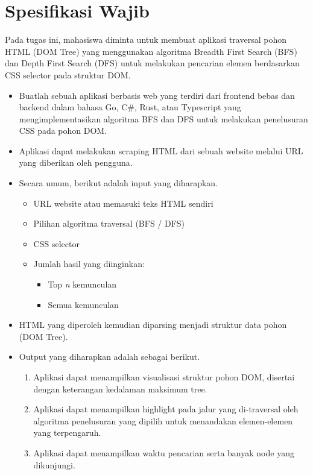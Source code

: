 \section{Spesifikasi Wajib}
Pada tugas ini, mahasiswa diminta untuk membuat aplikasi traversal pohon HTML (DOM Tree) yang menggunakan algoritma Breadth First Search (BFS) dan Depth First Search (DFS) untuk melakukan pencarian elemen berdasarkan CSS selector pada struktur DOM.
\begin{itemize}
    \item Buatlah sebuah aplikasi berbasis web yang terdiri dari frontend bebas dan backend dalam bahasa Go, C\#, Rust, atau Typescript yang mengimplementasikan algoritma BFS dan DFS untuk melakukan penelusuran CSS pada pohon DOM.
    \item Aplikasi dapat melakukan scraping HTML dari sebuah website melalui URL yang diberikan oleh pengguna.
    \item Secara umum, berikut adalah input yang diharapkan.
          \begin{itemize}
              \item URL website atau memasuki teks HTML sendiri
              \item Pilihan algoritma traversal (BFS / DFS)
              \item CSS selector
              \item Jumlah hasil yang diinginkan:
                    \begin{itemize}
                        \item Top \textit{n} kemunculan
                        \item Semua kemunculan
                    \end{itemize}
          \end{itemize}
    \item HTML yang diperoleh kemudian diparsing menjadi struktur data pohon (DOM Tree).
    \item Output yang diharapkan adalah sebagai berikut.
          \begin{enumerate}
              \item Aplikasi dapat menampilkan visualisasi struktur pohon DOM, disertai dengan keterangan kedalaman maksimum tree.
              \item Aplikasi dapat menampilkan highlight pada jalur yang di-traversal oleh algoritma penelusuran yang dipilih untuk menandakan elemen-elemen yang terpengaruh.
              \item Aplikasi dapat menampilkan waktu pencarian serta banyak node yang dikunjungi.

\end{enumerate}
\end{itemize}
